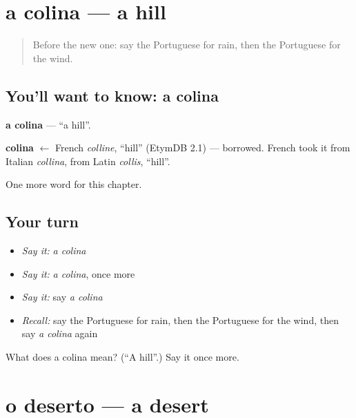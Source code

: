 \section[a colina]{a colina — a hill}

\label{lesson:PT-C59-colina}



\begin{quote}
Before the new one: say the Portuguese for rain, then the Portuguese for the wind.
\end{quote}

\subsection*{You'll want to know: a colina}
\textbf{a colina} — \textquotedblleft{}a hill\textquotedblright{}.

\begin{cousinweb}
\textbf{colina} $\leftarrow$ French \emph{colline}, \textquotedblleft{}hill\textquotedblright{} (EtymDB 2.1) — borrowed. French took it from Italian \emph{collina}, from Latin \emph{collis}, \textquotedblleft{}hill\textquotedblright{}.
\end{cousinweb}

\begin{grammarlens}[title={What you've built}]
One more word for this chapter.
\end{grammarlens}

\subsection*{Your turn}
\begin{itemize}
\raggedright
  \item \emph{Say it:} \emph{a colina}
  \item \emph{Say it:} \emph{a colina}, once more
  \item \emph{Say it:} say \emph{a colina}
  \item \emph{Recall:} say the Portuguese for rain, then the Portuguese for the wind, then say \emph{a colina} again
\end{itemize}

\begin{tcolorbox}[breakable,colback=teal!4,colframe=teal!35!black,title={Before you move on}]
What does a colina mean? (\textquotedblleft{}A hill\textquotedblright{}.) Say it once more.
\end{tcolorbox}
\section[o deserto]{o deserto — a desert}

